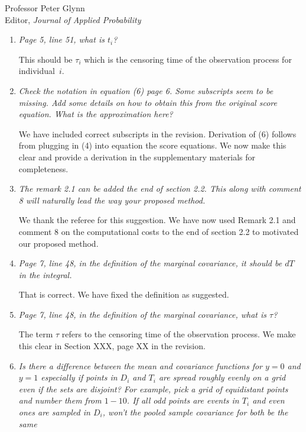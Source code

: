 \documentclass[11pt]{letter} %
\begin{document}
\begin{letter}{Professor
	Peter Glynn\\
	Editor, {\em Journal of Applied Probability}}
\begin{enumerate}
\item {\it Page 5, line 51, what is $t_i$?}

\vspace{5mm}
This should be $\tau_i$ which is the censoring time of the observation process for individual~$i$.
\vspace{5mm}

\item {\it Check the notation in equation (6) page 6. Some subscripts seem to be missing. Add some details on how to obtain this from the original score
equation. What is the approximation here?}

\vspace{5mm}
We have included correct subscripts in the revision.  Derivation of (6) follows from plugging in (4) into equation the score equations.  We now make this clear and provide a derivation in the supplementary materials for completeness.
\vspace{5mm}

\item{\it The remark 2.1 can be added the end of section 2.2. This along with
comment 8 will naturally lead the way your proposed method.}

\vspace{5mm}
We thank the referee for this suggestion.  We have now used Remark 2.1 and comment 8 on the computational costs to the end of section 2.2 to motivated our proposed method.
\vspace{5mm}

\item {\it Page 7, line 48, in the definition of the marginal covariance, it should be $dT$ in the integral.}

\vspace{5mm}
That is correct.  We have fixed the definition as suggested.
\vspace{5mm}

\item {\it Page 7, line 48, in the definition of the marginal covariance, what is $\tau$?}

\vspace{5mm}
The term $\tau$ refers to the censoring time of the observation process. We make this clear in Section XXX, page XX in the revision.
\vspace{5mm}


\item {\it Is there a difference between the mean and covariance functions for $y = 0$ and $y = 1$ especially if points in $D_i$ and $T_i$ are spread roughly evenly on a grid even if the sets are disjoint? For example, pick a grid of equidistant points and number them from $1-10$. If all odd points are events in $T_i$ and even ones are sampled in $D_i$, won't the pooled sample covariance for both be the same}


\end{enumerate}
\end{letter}
\end{document}
